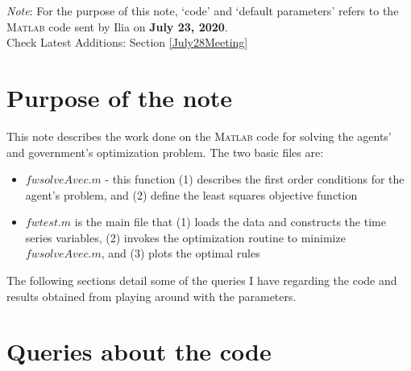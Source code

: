 \documentclass{../cls/NotesV2_Class}
\begin{document}



\textit{Note}: For the purpose of this note, `code' and `default parameters' refers to the \textsc{Matlab} code sent by Ilia on \textbf{July 23, 2020}.\\


Check Latest Additions: Section \ref{July28Meeting}

\section{Purpose of the note}

This note describes the work done on the \textsc{Matlab} code for solving the agents' and government's optimization problem. The two basic files are:
\begin{itemize}
	\item $fwsolveAvec.m$ - this function (1) describes the first order conditions for the agent's problem, and (2) define the least squares objective function
	\item $fwtest.m$ is the main file that (1) loads the data and constructs the time series variables, (2) invokes the optimization routine to minimize $fwsolveAvec.m$, and (3) plots the optimal rules
\end{itemize}

The following sections detail some of the queries I have regarding the code and results obtained from playing around with the parameters.

\section{Queries about the code}
\end{document}
